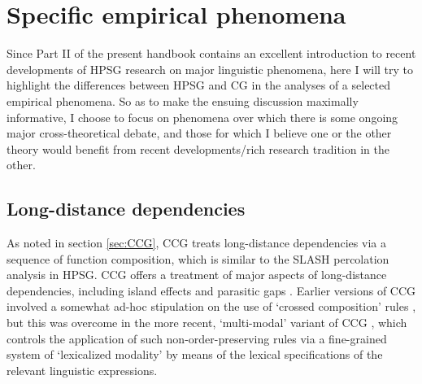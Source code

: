 \documentclass[output=paper]{langsci/langscibook}
\begin{document}
\section{Specific empirical phenomena }

Since Part II of the present handbook contains an excellent
introduction to recent developments of HPSG research on major
linguistic phenomena, here I will try to highlight the differences
between HPSG and CG in the analyses of a selected empirical phenomena.
So as to make the ensuing discussion maximally informative, I choose
to focus on phenomena over which there is some ongoing major
cross-theoretical debate, and those for which I believe one or the
other theory would benefit from recent developments/rich research
tradition in the other.




\subsection{Long-distance dependencies}

As noted in section \ref{sec:CCG}, CCG treats long-distance
dependencies via a sequence of function composition, which is similar
to the SLASH percolation analysis in HPSG. CCG offers a treatment of
major aspects of long-distance dependencies, including island effects
\citep{Steedman2000a-u} and parasitic gaps \citep{Steedman1987}. Earlier
versions of CCG involved a somewhat ad-hoc stipulation on the use of
`crossed composition' rules \citep{Steedman97a}, but this was overcome in
the more recent, `multi-modal' variant of CCG \citep{Baldridge2002a-u},
which controls the application of such non-order-preserving rules via
a fine-grained system of `lexicalized modality' by means of the
lexical specifications of the relevant linguistic expressions.
\end{document}
